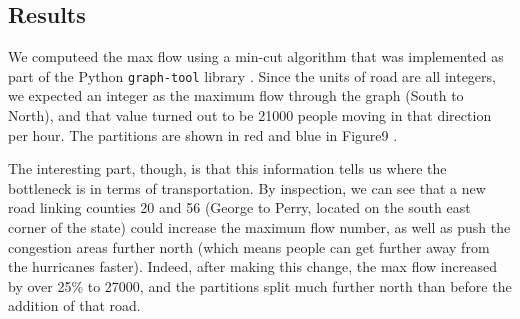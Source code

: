 \documentclass[titlepage]{article}
\begin{document}
  \subsection{Results}
  \par We computeed the max flow using a min-cut algorithm that was implemented as part of the Python \texttt{graph-tool} library \cite{graphtool}. Since the units of road are all integers, we expected an integer as the maximum flow through the graph (South to North), and that value turned out to be 21000 people moving in that direction per hour. The partitions are shown in red and blue in Figure9 .
  \par The interesting part, though, is that this information tells us where the bottleneck is in terms of transportation. By inspection, we can see that a new road linking counties 20 and 56 (George to Perry, located on the south east corner of the state) could increase the maximum flow number, as well as push the congestion areas further north (which means people can get further away from the hurricanes faster).
  Indeed, after making this change, the max flow increased by over 25\% to 27000, and the partitions split much further north than before the addition of that road.
\end{document}
